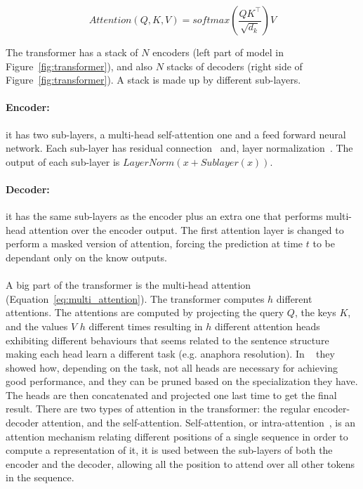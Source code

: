 \begin{equation}
    Attention\left(Q, K, V\right) = softmax\left(\frac{QK^\intercal}{\sqrt{d_k}}\right)V
    \label{eq:dot-attention}
\end{equation}

The transformer has a stack of $N$ encoders (left part of model in Figure~\ref{fig:transformer}), and also $N$ stacks of decoders (right side of Figure~\ref{fig:transformer}). A stack is made up by different sub-layers. 

\paragraph{Encoder:} it has two sub-layers, a multi-head self-attention one and a feed forward neural network. Each sub-layer has residual connection~\citep{he2016residual} and, layer normalization~\citep{lei2016normalization}. The output of each sub-layer is $LayerNorm(x + Sublayer(x))$.

\paragraph{Decoder:} it has the same sub-layers as the encoder plus an extra one that performs multi-head attention over the encoder output. The first attention layer is changed to perform a masked version of attention, forcing the prediction at time $t$ to be dependant only on the know outputs.

\paragraph{}
A big part of the transformer is the multi-head attention (Equation~\ref{eq:multi_attention}). The transformer computes $h$ different attentions. The attentions are computed by projecting the query $Q$, the keys $K$, and the values $V$ $h$ different times resulting in $h$ different attention heads exhibiting different behaviours that seems related to the sentence structure making each head learn a different task (e.g. anaphora resolution). In ~\citep{voita2019analyzing} they showed how, depending on the task, not all heads are necessary for achieving good performance, and they can be pruned based on the specialization they have. The heads are then concatenated and projected one last time to get the final result. There are two types of attention in the transformer: the regular encoder-decoder attention, and the self-attention. Self-attention, or intra-attention~\citep{cheng-etal-2016-long}, is an attention mechanism relating different positions of a single sequence in order to compute a representation of it, it is used between the sub-layers of both the encoder and the decoder, allowing all the position to attend over all other tokens in the sequence. 

